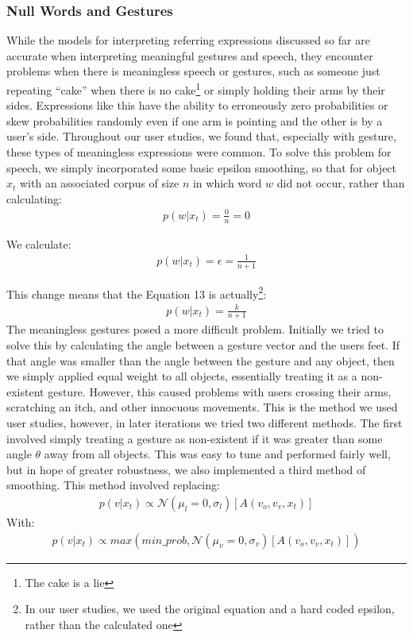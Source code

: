 \documentclass[a4paper, 11pt]{article} %
\begin{document}
\subsubsection{Null Words and Gestures}
While the models for interpreting referring expressions discussed so far are accurate when interpreting meaningful gestures and speech, they encounter problems when there is meaningless speech or gestures, such as someone just repeating ``cake'' when there is no cake\footnote{The cake is a lie} or simply holding their arms by their sides. Expressions like this have the ability to erroneously zero probabilities or skew probabilities randomly even if one arm is pointing and the other is by a user's side. Throughout our user studies, we found that, especially with gesture, these types of meaningless expressions were common. To solve this problem for speech, we simply incorporated some basic epsilon smoothing, so that for object $x_t$ with an associated corpus of size $n$ in which word $w$ did not occur, rather than calculating:
\begin{align}
p(w | x_t) = \frac{0}{n} = 0
\end{align}

We calculate:
\begin{align}
p(w | x_t) = \epsilon = \frac{1}{n+1}
\end{align}

This change means that the Equation 13 is actually\footnote{In our user studies, we used the original equation and a hard coded epsilon, rather than the calculated one}:
\begin{align}
p(w | x_t) = \frac{k}{n+1}
\end{align}
The meaningless gestures posed a more difficult problem. Initially we tried to solve this by calculating the angle between a gesture vector and the users feet. If that angle was smaller than the angle between the gesture and any object, then we simply applied equal weight to all objects, essentially treating it as a non-existent gesture. However, this caused problems with users crossing their arms, scratching an itch, and other innocuous movements. This is the method we used user studies, however, in later iterations we tried two different methods. The first involved simply treating a gesture as non-existent if it was greater than some angle $\theta$ away from all objects. This was easy to tune and performed fairly well, but in hope of greater robustness, we also implemented a third method of smoothing. This method involved replacing:
\begin{align}
p(v | x_t) \propto \mathcal{N}(\mu_l=0, \sigma_l)[A(v_o, v_v, x_t)]
\end{align}
With:
\begin{align}
p(v | x_t) \propto max(min\_prob, \mathcal{N}(\mu_v=0, \sigma_v)[A(v_o, v_v, x_t)])
\end{align}
\end{document}
